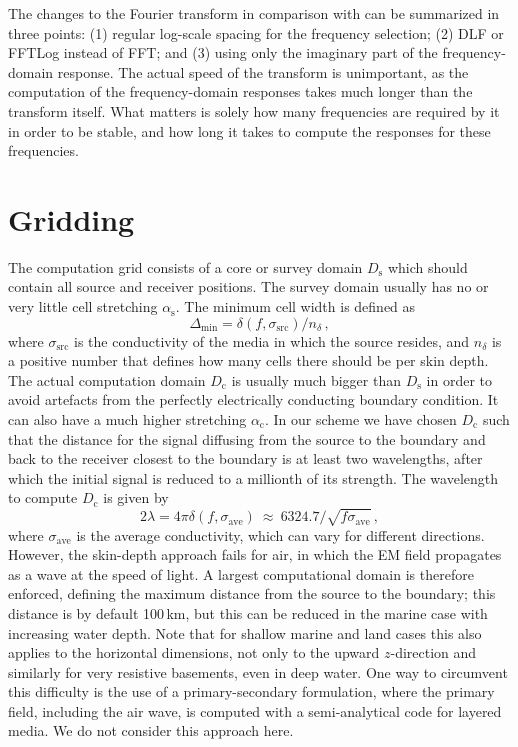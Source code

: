 \documentclass[
    manuscript,
  ]{geophysics}
\newcommand{\mr}[1]{\mathrm{#1}}
\begin{document}
The changes to the Fourier transform in comparison with \cite{GEO.08.Mulder}
can be summarized in three points: (1) regular log-scale spacing for the
frequency selection; (2) DLF or FFTLog instead of FFT; and (3) using only the
imaginary part of the frequency-domain response. The actual speed of the
transform is unimportant, as the computation of the frequency-domain responses
takes much longer than the transform itself. What matters is solely how many
frequencies are required by it in order to be stable, and how long it takes to
compute the responses for these frequencies.

\section{Gridding}

The computation grid consists of a core or survey domain $D_\mr{s}$ which
should contain all source and receiver positions. The survey domain usually has
no or very little cell stretching $\alpha_\mr{s}$. The minimum cell width is
defined as
%
\begin{equation}
  \Delta_\mr{min}=\delta(f, \sigma_\mr{src})/n_\delta \, ,
  \label{eq:minwidth}
\end{equation}
%
where $\sigma_\mr{src}$ is the conductivity of the media in which the source
resides, and $n_\delta$ is a positive number that defines how many cells there
should be per skin depth. The actual computation domain $D_\mr{c}$ is usually
much bigger than $D_\mr{s}$ in order to avoid artefacts from the perfectly
electrically conducting boundary condition. It can also have a much higher
stretching $\alpha_\mr{c}$. In our scheme we have chosen $D_\mr{c}$ such that
the distance for the signal diffusing from the source to the boundary and back
to the receiver closest to the boundary is at least two wavelengths, after
which the initial signal is reduced to a millionth of its strength. The
wavelength to compute $D_\mr{c}$ is given by
%
\begin{equation}
  2\lambda = 4\pi\delta(f, \sigma_\mr{ave})
  \ \approx \ 6324.7/\sqrt{f\sigma_\mr{ave}}\, ,
 \label{eq:lambda}
\end{equation}
%
where $\sigma_\mr{ave}$ is the average conductivity, which can vary for
different directions. However, the skin-depth approach fails for air, in which
the EM field propagates as a wave at the speed of light. A largest
computational domain is therefore enforced, defining the maximum distance from
the source to the boundary; this distance is by default 100\,km, but this can
be reduced in the marine case with increasing water depth. Note that for
shallow marine and land cases this also applies to the horizontal dimensions,
not only to the upward $z$-direction and similarly for very resistive
basements, even in deep water. One way to circumvent this difficulty is the use
of a primary-secondary formulation, where the primary field, including the air
wave, is computed with a semi-analytical code for layered media. We do not
consider this approach here.
\end{document}

